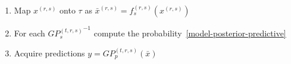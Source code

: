 \begin{enumerate}
\item Map $x^{(r,s)}$ onto $\tau$ as $\bar{x}^{(r,s)} = f^{(r, s)}_s(x^{(r,s)})$
\item For each ${GP_s^{(t,r,s)}}^{-1}$ compute the probability~\ref{model-posterior-predictive}
\item Acquire predictions $y = GP_p^{(t,r,s)}(\bar{x})$
\end{enumerate}


